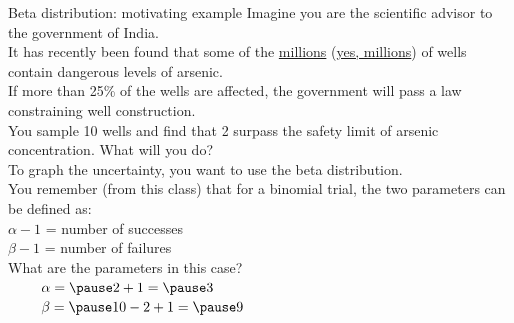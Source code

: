 \documentclass[xcolor=table,       handout,    xcolor=dvipsnames]{beamer}\usepackage[]{graphicx}\usepackage[]{color}
\begin{document}
\begin{frame}[fragile]{Beta distribution: motivating example}
\label{beta}
\pause Imagine you are the scientific advisor to the government of India. \pause \\
It has recently been found that some of the \href{https://aditimukherji.wordpress.com/2012/07/13/how-many-wells-and-tubewells-in-india-no-one-really-knows/}{millions} (\href{http://www.iwmi.cgiar.org/iwmi-tata/PDFs/2012_Highlight-05.pdf}{yes, millions}) of wells contain dangerous levels of arsenic. \pause \\
If more than 25\% of the wells are affected, the government will pass a law constraining well construction. \pause \\
You sample 10 wells and find that 2 surpass the safety limit of arsenic concentration. \pause \alert{What will you do?} \pause \\
To graph the uncertainty, you want to use the beta distribution. \pause \\
You remember (from this class) that for a binomial trial, the two parameters can be defined as:\\
\pause $\alpha-1$ = number of successes\\
\pause $\beta-1$ = number of failures\\
\pause What are the parameters in this case?\\
\pause ~~~~ $\alpha = \pause 2+1 = \pause 3$\\
\pause ~~~~ $\beta = \pause 10-2 + 1 = \pause 9$
\end{frame}

\end{document}
